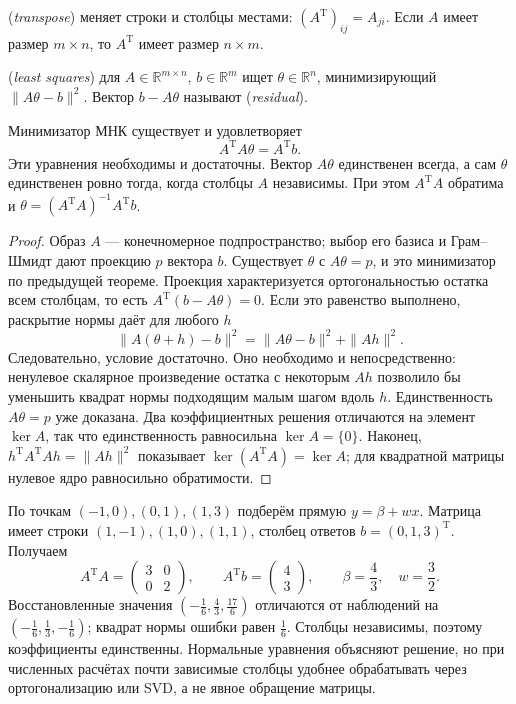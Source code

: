 \begin{definition} (\emph{transpose}) меняет строки и столбцы местами: \((A^{\mathrm T})_{ij}=A_{ji}\). Если \(A\) имеет размер \(m\times n\), то \(A^{\mathrm T}\) имеет размер \(n\times m\).\end{definition}
\begin{definition} (\emph{least squares}) для \(A\in\mathbb R^{m\times n}\), \(b\in\mathbb R^m\) ищет \(\theta\in\mathbb R^n\), минимизирующий \(\|A\theta-b\|^2\). Вектор \(b-A\theta\) называют  (\emph{residual}).\end{definition}
\begin{theorem}\label{thm:review-ml-normal}
Минимизатор МНК существует и удовлетворяет
\[A^{\mathrm T}A\theta=A^{\mathrm T}b.\]
Эти уравнения необходимы и достаточны. Вектор \(A\theta\) единственен всегда, а сам \(\theta\) единственен ровно тогда, когда столбцы \(A\) независимы. При этом \(A^{\mathrm T}A\) обратима и \(\theta=(A^{\mathrm T}A)^{-1}A^{\mathrm T}b\).
\end{theorem}
\begin{proof}Образ \(A\) --- конечномерное подпространство; выбор его базиса и Грам--Шмидт дают проекцию \(p\) вектора \(b\). Существует \(\theta\) с \(A\theta=p\), и это минимизатор по предыдущей теореме. Проекция характеризуется ортогональностью остатка всем столбцам, то есть \(A^{\mathrm T}(b-A\theta)=0\). Если это равенство выполнено, раскрытие нормы даёт для любого \(h\)
\[\|A(\theta+h)-b\|^2=\|A\theta-b\|^2+\|Ah\|^2.\]
Следовательно, условие достаточно. Оно необходимо и непосредственно: ненулевое скалярное произведение остатка с некоторым \(Ah\) позволило бы уменьшить квадрат нормы подходящим малым шагом вдоль \(h\).
Единственность \(A\theta=p\) уже доказана. Два коэффициентных решения отличаются на элемент \(\ker A\), так что единственность равносильна \(\ker A=\{0\}\). Наконец, \(h^{\mathrm T}A^{\mathrm T}Ah=\|Ah\|^2\) показывает \(\ker(A^{\mathrm T}A)=\ker A\); для квадратной матрицы нулевое ядро равносильно обратимости.\end{proof}
\begin{example}По точкам \((-1,0),(0,1),(1,3)\) подберём прямую \(y=\beta+wx\). Матрица имеет строки \((1,-1),(1,0),(1,1)\), столбец ответов \(b=(0,1,3)^{\mathrm T}\). Получаем
\[A^{\mathrm T}A=\begin{pmatrix}3&0\\0&2\end{pmatrix},\qquad A^{\mathrm T}b=\begin{pmatrix}4\\3\end{pmatrix},\qquad \beta=\frac43,\quad w=\frac32.\]
Восстановленные значения \((-\frac16,\frac43,\frac{17}6)\) отличаются от наблюдений на \((-\frac16,\frac13,-\frac16)\); квадрат нормы ошибки равен \(\frac16\). Столбцы независимы, поэтому коэффициенты единственны. Нормальные уравнения объясняют решение, но при численных расчётах почти зависимые столбцы удобнее обрабатывать через ортогонализацию или SVD, а не явное обращение матрицы.\end{example}

